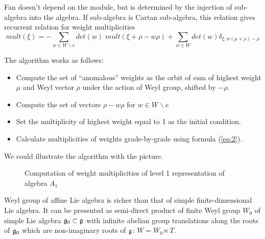 \documentclass[a4paper,12pt]{article}
\theoremstyle{definition} \newtheorem{Def}{Definition}
\begin{document}
Fan doesn't depend on the module, but
is determined by the injection of sub-algebra into the algebra. If 
sub-algebra is Cartan sub-algebra, this relation gives recurrent
relation for weight multiplicities
\begin{equation}
  \label{eq:2}
  mult(\xi)=-\sum_{w\in W\backslash e}det(w)\;mult(\xi+\rho-w\rho)+\sum_{w\in W}det(w)\delta_{\xi,w(\mu+\rho)-\rho}
\end{equation}

The algorithm works as follows:
\begin{itemize}
\item Compute the set of ``anomalous'' weights as the orbit of sum of
  highest weight $\mu$ and Weyl vector $\rho$ under the action of Weyl
  group, shifted by $-\rho$.
\item Compute the set of vectors $\rho-w\rho$ for $w\in W\backslash e$
\item Set the multiplicity of highest weight equal to 1 as the initial condition.
\item Calculate multiplicities of weights grade-by-grade using formula (\ref{eq:2}).
\end{itemize}

We could illustrate the algorithm with the picture.
\begin{figure}[bh]
  \noindent{}
  \caption{Computation of weight multiplicities of level 1
    representation of algebra $A_1$}
  \label{A1 with star}
\end{figure}

Weyl group of affine Lie algebra is richer than that of simple
finite-dimensional Lie algebra. It can be presented as semi-direct
product of finite Weyl group $W_0$ of simple Lie algebra
$\frak{g}_0\subset \frak{g}$ with infinite abelian group translations
along the roots of $\frak{g}_0$ which are non-imaginary roots of $\frak{g}$: 
$W=W_0\ltimes T$.
\end{document}
